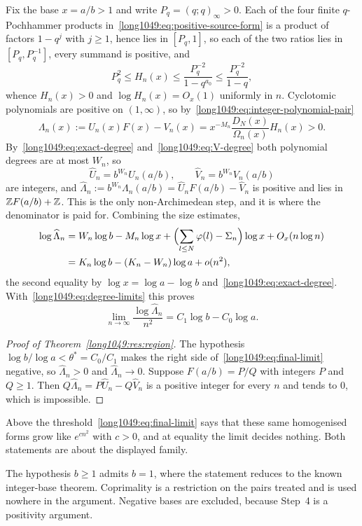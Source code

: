 \documentclass[11pt]{article}
\begin{document}
Fix the base $x=a/b>1$ and write $P_q=(q;q)_\infty>0$.  Each of the four finite
$q$-Pochhammer products in~\eqref{long1049:eq:positive-source-form} is a product of
factors $1-q^{j}$ with $j\ge1$, hence lies in $[P_q,1]$, so each of the two
ratios lies in $[P_q,P_q^{-1}]$, every summand is positive, and
\[
 P_q^{2}\le H_n(x)\le\frac{P_q^{-2}}{1-q^{a_0}}\le\frac{P_q^{-2}}{1-q},
\]
whence $H_n(x)>0$ and $\log H_n(x)=O_x(1)$ uniformly in $n$.  Cyclotomic
polynomials are positive on $(1,\infty)$, so
by~\eqref{long1049:eq:integer-polynomial-pair}
\[
 \Lambda_n(x):=U_n(x)F(x)-V_n(x)=x^{-M_n}\frac{D_N(x)}{\Omega_n(x)}H_n(x)>0 .
\]
By~\eqref{long1049:eq:exact-degree} and~\eqref{long1049:eq:V-degree} both polynomial degrees are
at most $W_n$, so
\[
 \widehat U_n=b^{W_n}U_n(a/b),\qquad \widehat V_n=b^{W_n}V_n(a/b)
\]
are integers, and $\widehat\Lambda_n:=b^{W_n}\Lambda_n(a/b)
=\widehat U_nF(a/b)-\widehat V_n$ is positive and lies in $\mathbb{Z} F(a/b)+\mathbb{Z}$.  This
is the only non-Archimedean step, and it is where the denominator is paid for.
Combining the size estimates,
\[
 \begin{aligned}
 \log\widehat\Lambda_n
 &=W_n\log b-M_n\log x+\Bigl(\sum_{l\le N}\varphi(l)-\Sigma_n\Bigr)\log x+O_x(n\log n)\\
 &=K_n\log b-(K_n-W_n)\log a+o(n^{2}),
\end{aligned}
\]
the second equality by $\log x=\log a-\log b$ and~\eqref{long1049:eq:exact-degree}.
With~\eqref{long1049:eq:degree-limits} this proves
\begin{equation}\label{long1049:eq:final-limit}
 \lim_{n\to\infty}\frac{\log\widehat\Lambda_n}{n^{2}}=C_1\log b-C_0\log a .
\end{equation}

\begin{proof}[Proof of Theorem~\ref{long1049:res:region}]
The hypothesis $\log b/\log a<\theta^{*}=C_0/C_1$ makes the right side
of~\eqref{long1049:eq:final-limit} negative, so $\widehat\Lambda_n>0$ and
$\widehat\Lambda_n\to0$.  Suppose $F(a/b)=P/Q$ with integers $P$ and $Q\ge1$.
Then $Q\widehat\Lambda_n=P\widehat U_n-Q\widehat V_n$ is a positive integer for
every $n$ and tends to $0$, which is impossible.
\end{proof}

\noindent Above the threshold~\eqref{long1049:eq:final-limit} says that these same
homogenised forms grow like $e^{cn^{2}}$ with $c>0$, and at equality the limit
decides nothing.  Both statements are about the displayed family.

\noindent The hypothesis $b\ge1$ admits $b=1$, where the statement reduces to
the known integer-base theorem.  Coprimality is a restriction on the pairs
treated and is used nowhere in the argument.  Negative bases are excluded,
because Step~4 is a positivity argument.
\end{document}
